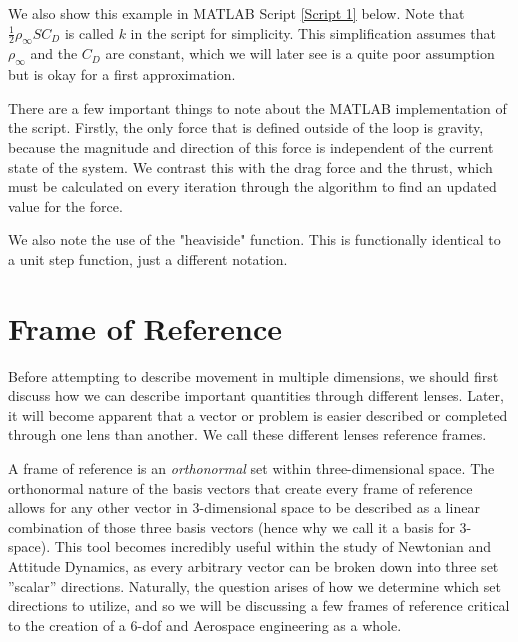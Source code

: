 \documentclass[12pt]{report}
\begin{document}
We also show this example in MATLAB Script \ref{Script 1} below. Note that $\frac{1}{2}\rho_{\infty}SC_D$ is called $k$ in the script for simplicity. This simplification assumes that $\rho_{\infty}$ and the $C_D$ are constant, which we will later see is a quite poor assumption but is okay for a first approximation.

\lstset{style=mystyle}

\label{Script 1}

There are a few important things to note about the MATLAB implementation of the script. Firstly, the only force that is defined outside of the loop is gravity, because the magnitude and direction of this force is independent of the current state of the system. We contrast this with the drag force and the thrust, which must be calculated on every iteration through the algorithm to find an updated value for the force.

We also note the use of the "heaviside" function. This is functionally identical to a unit step function, just a different notation.

\section{Frame of Reference}\label{sec:Frame of Reference}
Before attempting to describe movement in multiple dimensions, we should first discuss how we can describe important quantities through different lenses. Later, it will become apparent that a vector or problem is easier described or completed through one lens than another. We call these different lenses reference frames.

A frame of reference is an \textit{orthonormal} set within three-dimensional space. The orthonormal nature of the basis vectors that create every frame of reference allows for any other vector in 3-dimensional space to be described as a linear combination of those three basis vectors (hence why we call it a basis for 3-space). This tool becomes incredibly useful within the study of Newtonian and Attitude Dynamics, as every arbitrary vector can be broken down into three set ''scalar'' directions. Naturally, the question arises of how we determine which set directions to utilize, and so we will be discussing a few frames of reference critical to the creation of a 6-\gls{dof} and Aerospace engineering as a whole.
\end{document}
